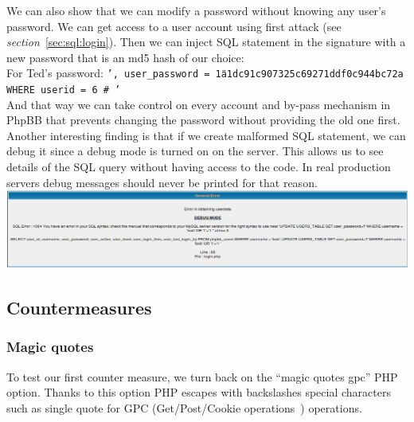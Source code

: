 \documentclass[12pt, a4paper, pdflatex]{article}
\begin{document}
We can also show that we can modify a password without knowing any user's password. We can get access to a user account using first attack (see \emph{section}~\ref{sec:sql:login}). Then we can inject SQL statement in the signature with a new password that is an md5 hash of our choice:\\
For Ted's password: \texttt{', user\_password = \"1a1dc91c907325c69271ddf0c944bc72a WHERE userid = 6 \# '}\\
And that way we can take control on every account and by-pass mechanism in PhpBB that prevents changing the password without providing the old one first.\\

Another interesting finding is that if we create malformed SQL statement, we can debug it since a debug mode is turned on on the server. This allows us to see details of the SQL query without having access to the code. In real production servers debug messages should never be printed for that reason.\\
\includegraphics[width=.95\textwidth]{gfx/sql/debug.png}

\subsection{Countermeasures}

\subsubsection{Magic quotes}
To test our first counter measure, we turn back on the ``magic quotes gpc'' PHP option. Thanks to this option PHP escapes with backslashes special characters such as single quote for GPC (Get/Post/Cookie operations~\cite{phpman}) operations.
\end{document}
